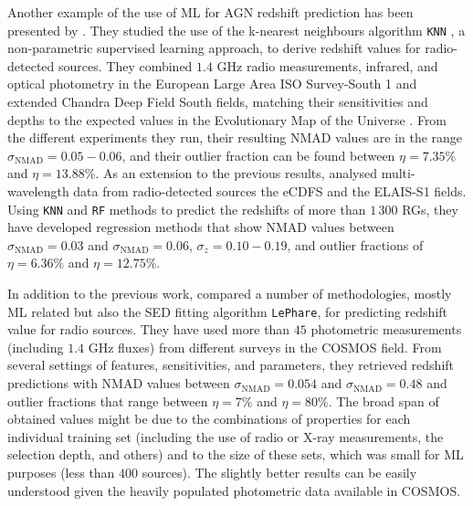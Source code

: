 \documentclass{aa}
\begin{document}
Another example of the use of ML for AGN redshift prediction has been presented by \citet{2019PASP..131j8003L}. They studied the use of the k-nearest neighbours algorithm \verb|KNN| \citep{1053964}, a non-parametric supervised learning approach, to derive redshift values for radio-detected sources. They combined $1.4$ GHz radio measurements, infrared, and optical photometry in the European Large Area ISO Survey-South 1 \citep[ELAIS-S1;][]{2000MNRAS.316..749O} and extended Chandra Deep Field South \citep[eCDFS;][]{2005ApJS..161...21L} fields, matching their sensitivities and depths to the expected values in the Evolutionary Map of the Universe \citep[EMU;][]{2011PASA...28..215N}. From the different experiments they run, their resulting NMAD values are in the range ${\sigma_{\mathrm{NMAD}} = 0.05 - 0.06}$, and their outlier fraction can be found between ${\eta = 7.35 \%}$ and ${\eta = 13.88 \%}$. 
As an extension to the previous results, \citet{LUKEN2022100557} analysed multi-wavelength data from radio-detected sources the eCDFS and the ELAIS-S1 fields. Using \texttt{KNN} and \texttt{RF} methods to predict the redshifts of more than $1\,300$ RGs, they have developed regression methods that show NMAD values between ${\sigma_{\mathrm{NMAD}} = 0.03}$ and ${\sigma_{\mathrm{NMAD}} = 0.06}$, ${\sigma_{z} = 0.10 - 0.19}$, and outlier fractions of ${\eta = 6.36 \%}$ and ${\eta = 12.75 \%}$.

In addition to the previous work, \citet{2019PASP..131j8004N} compared a number of methodologies, mostly ML related but also the SED fitting algorithm \texttt{LePhare}, for predicting redshift value for radio sources. They have used more than $45$ photometric measurements (including $1.4$ GHz fluxes) from different surveys in the COSMOS field. From several settings of features, sensitivities, and parameters, they retrieved redshift predictions with NMAD values between ${\sigma_{\mathrm{NMAD}} = 0.054}$ and ${\sigma_{\mathrm{NMAD}} = 0.48}$ and outlier fractions that range between ${\eta = 7 \%}$ and ${\eta = 80 \%}$. The broad span of obtained values might be due to the combinations of properties for each individual training set (including the use of radio or X-ray measurements, the selection depth, and others) and to the size of these sets, which was small for ML purposes (less than $400$ sources). The slightly better results can be easily understood given the heavily populated photometric data available in COSMOS.
\end{document}
